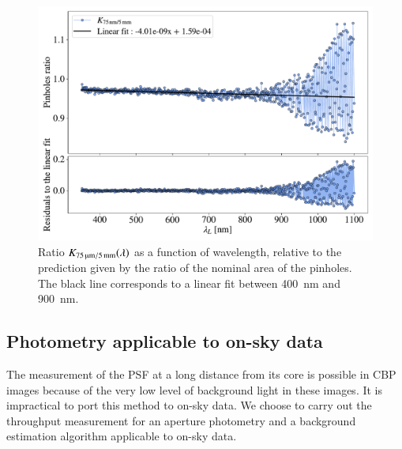 \begin{figure}[h]
    \centering
    \includegraphics[width=\columnwidth]{fig/ratio_pinholes.pdf}
    \caption{Ratio $K_\mathrm{\SI{75}{\micro\meter}/\SI{5}{\milli\meter}}(\lambda)$ as a function of wavelength, relative to the prediction given by the ratio of the nominal area of the pinholes. The black line corresponds to a linear fit between \SI{400}{\nm} and \SI{900}{\nm}.}
    \label{fig:ratio_pinholes}
\end{figure}


\subsection{Photometry applicable to on-sky data}
\label{sec:photometry_small}

The measurement of the PSF at a long distance from its core is possible in CBP images because of the very low level of background light in these images. It is impractical to port this method to on-sky data. We choose to carry out the throughput measurement for an aperture photometry and a background estimation algorithm applicable to on-sky data. 

